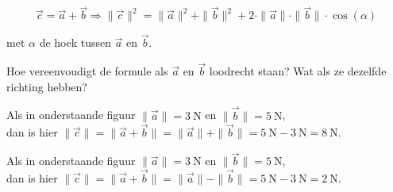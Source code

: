 \documentclass{ximera}
\begin{document}
\[
\vec{c} = \vec{a} + \vec{b} \Rightarrow \| \vec{c} \|^2 = \| \vec{a} \|^2 + \| \vec{b} \|^2 + 2 \cdot \|\vec{a}\| \cdot \|\vec{b}\| \cdot \cos(\alpha)
\]

met \(\alpha\) de hoek tussen \(\vec{a}\) en \(\vec{b}\). 


\begin{quickquestion*}{}{}
  Hoe vereenvoudigt de formule als \(\vec{a}\) en \(\vec{b}\) loodrecht staan? Wat als ze dezelfde richting hebben? 
\end{quickquestion*}

\begin{example}

\begin{question}
Als in onderstaande figuur \(\|\vec{a}\| = \SI{3}{\newton}\) en \(\|\vec{b}\| = \SI{5}{\newton}\),\\
dan is hier  \(\| \vec{c} \| = \|\vec{a} + \vec{b} \| = \|\vec{a}\| + \|\vec{b}\| = \SI{5}{\newton} - \SI{3}{\newton}= \SI{8}{\newton}\). 

\begin{image}[!]
\end{image}
\end{question}

\begin{question}

Als in onderstaande figuur \(\|\vec{a}\| = \SI{3}{\newton}\) en \(\|\vec{b}\| = \SI{5}{\newton}\), \\
dan is hier \(\| \vec{c} \| = \|\vec{a} + \vec{b} \| = \|\vec{a}\|  - \|\vec{b}\| =  \SI{5}{\newton} - \SI{3}{\newton}  = \SI{2}{\newton}\). 


\end{question}
\end{example}
\end{document}
